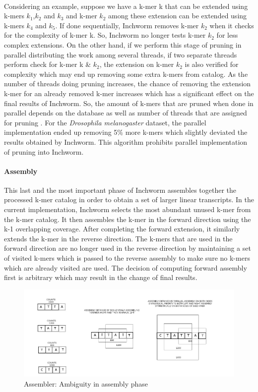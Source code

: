\label{key}\documentclass[plainarticle, english ,zihtitle,final,hyperref,utf8]{zihpub}
\begin{document}
\paragraph{}Considering an example, suppose we have a k-mer k that can be extended using k-mers {$k_{1}$,$k_{2}$ and $k_{3}$} and k-mer $k_{2}$ among these extension can be extended using k-mers {$k_{4}$ and $k_{5}$}. If done sequentially, Inchworm removes k-mer $k_{2}$ when it checks for the complexity of k-mer k. So, Inchworm no longer tests k-mer $k_{2}$ for less complex extensions. On the other hand, if we perform this stage of pruning in parallel distributing the work among several threads, if two separate threads perform check for k-mer k \& $k_{2}$, the extension on k-mer $k_{2}$ is also verified for complexity which may end up removing some extra k-mers from catalog. As the number of threads doing pruning increases, the chance of removing the extension k-mer for an already removed k-mer increases which has a significant effect on the final results of Inchworm. So, the amount of k-mers that are pruned when done in parallel depends on the database as well as number of threads that are assigned for pruning . For the  \emph{Drosophila melanogaster} dataset, the parallel implementation ended up removing 5\% more k-mers which slightly deviated the results obtained by Inchworm. This algorithm prohibits parallel implementation of pruning into Inchworm.
\paragraph{Assembly}
This last and the most important phase of Inchworm assembles together the processed k-mer catalog in order to obtain a set of larger linear transcripts. In the current implementation, Inchworm selects the most abundant unused k-mer from the k-mer catalog. It then assembles the k-mer in the forward direction using the k-1 overlapping coverage. After completing the forward extension, it similarly extends the k-mer in the reverse direction. The k-mers that are used in the forward direction are no longer used in the reverse direction by maintaining a set of visited k-mers which is passed to the reverse assembly to make sure no k-mers which are already visited are used. The decision of computing forward assembly first is arbitrary which may result in the change of final results.
\begin{figure}[h]
\center
\includegraphics[scale=0.5]{assemble}
\caption{Assembler: Ambiguity in assembly phase}
\label{ambiguity}
\end{figure}
\end{document}
